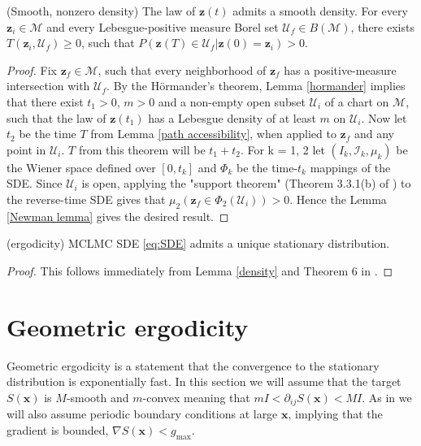 \documentclass[tablecaption=bottom,wcp]{jmlr} %
\newcommand{\x}{\boldsymbol{x}}
\newcommand{\Z}{\boldsymbol{z}}
\begin{document}
\begin{lemma} (Smooth, nonzero density) \label{density}
    The law of $\boldsymbol{z}(t)$ admits a smooth density. For every $\Z_i \in \mathcal{M}$ and every Lebesgue-positive measure Borel set $\mathcal{U}_f \in B(\mathcal{M})$, there exists $T(\Z_i,\mathcal{U}_f) \geq 0$, such that $P(\boldsymbol{z}(T) \in \mathcal{U}_f \vert \Z(0) = \Z_i) > 0$.
\end{lemma}
\begin{proof}
    Fix $\Z_f \in \mathcal{M}$, such that every neighborhood of $\Z_f$ has a positive-measure intersection with $\mathcal{U}_f$. By the H\"ormander's theorem, Lemma \ref{hormander} implies that there exist $t_1 > 0$, $m> 0$ and a non-empty open subset $\mathcal{U}_i$ of a chart on $\mathcal{M}$, such that the law of $\Z(t_1)$ has a Lebesgue density of at least $m$ on $\mathcal{U}_i$. Now let $t_2$ be the time $T$ from Lemma \ref{path accessibility}, when applied to $\Z_f$ and any point in $\mathcal{U}_i$. $T$ from this theorem will be $t_1 + t_2$. 
    For k = 1, 2 let $(I_k, \mathcal{I}_k, \mu_k)$ be the Wiener space defined over $[0,t_k]$ and $\Phi_k$ be the time-$t_k$ mappings of the SDE. Since $\mathcal{U}_i$ is open, applying the "support theorem" (Theorem 3.3.1(b) of \cite{MallivianCalculus}) to the reverse-time SDE gives that $\mu_2(\Z_f \in \Phi_2(\mathcal{U}_i)) > 0$. Hence the Lemma \ref{Newman lemma} gives the desired result.
\end{proof}

\begin{theorem} (ergodicity)
    MCLMC SDE \eqref{eq:SDE} admits a unique stationary distribution.
\end{theorem}
\begin{proof}
    This follows immediately from Lemma \ref{density} and Theorem 6 in \cite{NoseHooverProof}.
\end{proof}

\section{Geometric ergodicity} \label{sec: geometric ergodicity}

Geometric ergodicity is a statement that the convergence to the stationary distribution is exponentially fast. 
In this section we will assume that the target $S(\x)$ is $M$-smooth and $m$-convex meaning that $m I < \partial_{ij} S(\x) < M I$.
As in \cite{MolecularDynamics} we will also assume periodic boundary conditions at large $\x$, implying that the gradient is bounded, $\nabla S(\x) < g_{\mathrm{max}}$.
\end{document}
